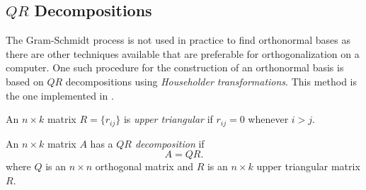 \documentclass{ximera}
\begin{document}
\subsection*{$QR$ Decompositions}

The Gram-Schmidt process is not used in practice to find orthonormal bases
as there are other techniques available that are preferable for
orthogonalization on a computer.  One such procedure for the construction of
an orthonormal basis is based on $QR$ decompositions using {\em Householder
transformations}.  This method is the one
implemented in \Matlab.

An $n\times k$ matrix $R=\{r_{ij}\}$ is {\em upper triangular\/} if
$r_{ij}=0$ whenever $i>j$.

\begin{definition}  \label{qr-Def} 
An $n\times k$ matrix $A$ has a {\em $QR$ decomposition\/} if
\begin{equation} \label{eq:qrdecom}
A=QR.
\end{equation}
where $Q$ is an $n\times n$
orthogonal matrix
and $R$ is an $n\times k$
upper triangular matrix $R$.
\end{definition}
\end{document}
